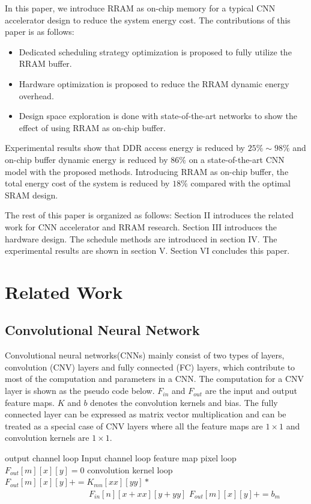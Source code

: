 \documentclass[10pt, conference]{IEEEtran}
\begin{document}
    In this paper, we introduce RRAM as on-chip memory for a typical CNN accelerator design to reduce the system energy cost. The contributions of this paper is as follows:
    \begin{itemize}
    \item {Dedicated scheduling strategy optimization is proposed to fully utilize the RRAM buffer.}
    \item {Hardware optimization is proposed to reduce the RRAM dynamic energy overhead.}
    \item {Design space exploration is done with state-of-the-art networks to show the effect of using RRAM as on-chip buffer.}
    \end{itemize}
    Experimental results show that DDR access energy is reduced by $25\%\sim 98\%$ and on-chip buffer dynamic energy is reduced by $86\%$ on a state-of-the-art CNN model with the proposed methods. Introducing RRAM as on-chip buffer, the total energy cost of the system is reduced by $18\%$ compared with the optimal SRAM design.
    
    The rest of this paper is organized as follows: Section II introduces the related work for CNN accelerator and RRAM research. Section III introduces the hardware design. The schedule methods are introduced in section IV. The experimental results are shown in section V. Section VI concludes this paper.
    
    
    \section{Related Work}
    \subsection{Convolutional Neural Network}
    Convolutional neural networks(CNNs) mainly consist of two types of layers, convolution (CNV) layers and fully connected (FC) layers, which contribute to most of the computation and parameters in a CNN. The computation for a CNV layer is shown as the pseudo code below. $F_{in}$ and $F_{out}$ are the input and output feature maps. $K$ and $b$ denotes the convolution kernels and bias. The fully connected layer can be expressed as matrix vector multiplication and can be treated as a special case of CNV layers where all the feature maps are $1\times 1$ and convolution kernels are $1\times 1$.
    
    \begin{codebox}
    \li \Comment output channel loop
    \li {} 
      \Do
    \li   \Comment Input channel loop
    \li   {}
        \Do
    \li  	\Comment feature map pixel loop
    \li 	{}
        \Do
    \li   	  $F_{out}[m][x][y]=0$
    \li 	  \Comment convolution kernel loop
    \li 	  {}
              \Do
    \li 		$F_{out}[m][x][y] += K_{mn}[xx][yy]*$\\
          $\qquad\qquad\qquad\qquad\qquad F_{in}[n][x+xx][y+yy] $
              \End
    \li 	  $F_{out}[m][x][y]+=b_m$
            \End 
        \End
        \End 
    \end{codebox}
    
\end{document}
